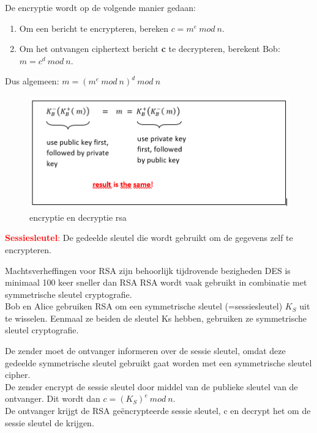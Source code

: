 
De encryptie wordt op de volgende manier gedaan:

\begin{enumerate}
\item Om een bericht te encrypteren, bereken $c = m^e\ mod\ n$.
\item Om het ontvangen ciphertext bericht \textbf{c} te decrypteren, berekent Bob: $m = c^d\ mod\ n$.
\end{enumerate}

\noindent Dus algemeen: $m = (m^e\ mod\ n)^d \ mod\ n$

\begin{figure}[h]
    \centering
    \includegraphics[width=7in]{./img/imghfdst8/diffie.PNG}
    \caption{encryptie en decryptie rsa}      
    \label{fig:encryptie en decryptie rsa }
\end{figure}


\textcolor{red}{\textbf{Sessiesleutel}:} De gedeelde sleutel die wordt gebruikt om de gegevens zelf te encrypteren.

\bi
\itf Machtsverheffingen voor RSA zijn behoorlijk tijdrovende bezigheden
\itf DES is minimaal 100 keer sneller dan RSA
\ei
RSA wordt vaak gebruikt in combinatie met symmetrische sleutel cryptografie.\\
Bob en Alice gebruiken RSA om een symmetrische sleutel (=sessiesleutel) $K_S$ uit te wisselen. Eenmaal ze beiden de sleutel Ks hebben, gebruiken ze symmetrische sleutel cryptografie.

De zender moet de ontvanger informeren over de sessie sleutel, omdat deze gedeelde symmetrische sleutel gebruikt gaat worden met een symmetrische sleutel cipher. \\
De zender encrypt de sessie sleutel door middel van de publieke sleutel van de ontvanger. Dit wordt dan $c = (K_S)^e\ mod\ n$.\\ De ontvanger krijgt de RSA geëncrypteerde sessie sleutel, c en decrypt het om de sessie sleutel de krijgen.

